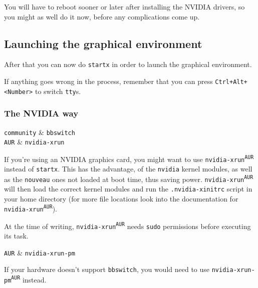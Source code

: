 \documentclass[10pt]{dustdoc}
\begin{document}
\begin{NOTE}
    You will have to reboot sooner or later after installing the NVIDIA drivers, so you might as well do it now, before any complications come up.
\end{NOTE}

\subsection{Launching the graphical environment}
\label{sec:launching-the-graphical-environment}

After that you can now do \texttt{startx} in order to launch the graphical environment.

If anything goes wrong in the process, remember that you can press \texttt{Ctrl+Alt+<Number>} to switch \texttt{tty}s.

\subsubsection{The NVIDIA way}
\label{sec:the-nvidia-way}

\begin{packagetable}
    \texttt{community} & \texttt{bbswitch} \\
    \texttt{AUR} & \texttt{nvidia-xrun} \\
\end{packagetable}

If you’re using an NVIDIA graphics card, you might want to use \texttt{nvidia-xrun\textsuperscript{\texttt{AUR}}} instead of \texttt{startx}.
This has the advantage, of the \texttt{nvidia} kernel modules, as well as the \texttt{nouveau} ones not loaded at boot time, thus saving power.
\texttt{nvidia-xrun\textsuperscript{\texttt{AUR}}} will then load the correct kernel modules and run the \texttt{.nvidia-xinitrc} script in your home directory (for more file locations look into the documentation for \texttt{nvidia-xrun\textsuperscript{\texttt{AUR}}}).

\begin{IMPORTANT}
    At the time of writing, \texttt{nvidia-xrun\textsuperscript{\texttt{AUR}}} needs \texttt{sudo} permissions before executing its task.
\end{IMPORTANT}

\begin{NOTE}
    \begin{packagetable}
        \texttt{AUR} & \texttt{nvidia-xrun-pm} \\
    \end{packagetable}

    If your hardware doesn’t support \texttt{bbswitch}, you would need to use \texttt{nvidia-xrun-pm\textsuperscript{\texttt{AUR}}} instead.
\end{NOTE}
\end{document}
